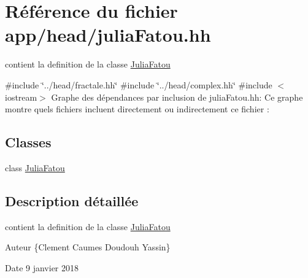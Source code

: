 \hypertarget{juliaFatou_8hh}{}\section{Référence du fichier app/head/julia\+Fatou.hh}
\label{juliaFatou_8hh}


contient la definition de la classe \hyperlink{classJuliaFatou}{Julia\+Fatou}  


{\ttfamily \#include \char`\"{}../head/fractale.\+hh\char`\"{}}\newline
{\ttfamily \#include \char`\"{}../head/complex.\+hh\char`\"{}}\newline
{\ttfamily \#include $<$iostream$>$}\newline
Graphe des dépendances par inclusion de julia\+Fatou.\+hh\+:
Ce graphe montre quels fichiers incluent directement ou indirectement ce fichier \+:
\subsection*{Classes}
\begin{DoxyCompactItemize}
\item 
class \hyperlink{classJuliaFatou}{Julia\+Fatou}
\end{DoxyCompactItemize}


\subsection{Description détaillée}
contient la definition de la classe \hyperlink{classJuliaFatou}{Julia\+Fatou} 

\begin{DoxyAuthor}{Auteur}
\{Clement Caumes Doudouh Yassin\} 
\end{DoxyAuthor}
\begin{DoxyDate}{Date}
9 janvier 2018 
\end{DoxyDate}
